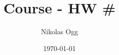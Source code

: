\documentclass{article}
\title{Course - HW \#}
\date{\today}
\author{Nikolas Ogg}
\begin{document}

\section{}
\end{document}
